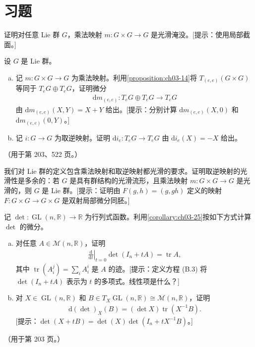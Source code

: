 \documentclass[../../main.tex]{subfiles}
\begin{document}
\section{习题}\label{section:ch07-习题}

\begin{exercise}\label{exercise:ch07-01}
证明对任意 Lie 群 $G$，乘法映射 $m\colon G\times G\to G$ 是光滑淹没。[提示：使用局部截面。]
\end{exercise}

\begin{exercise}\label{exercise:ch07-02}
设 $G$ 是 Lie 群。
\begin{enumerate}[(a)]
\item 记 $m\colon G\times G\to G$ 为乘法映射。利用\cref{proposition:ch03-14}将 $T_{(e,e)}(G\times G)$ 等同于 $T_eG\oplus T_eG$，证明微分
\begin{align*}
\mathrm{d}m_{(e,e)}\colon T_eG\oplus T_eG\to T_eG
\end{align*}
由 $\mathrm{d}m_{(e,e)}(X,Y)=X+Y$ 给出。[提示：分别计算 $\mathrm{d}m_{(e,e)}(X,0)$ 和 $\mathrm{d}m_{(e,e)}(0,Y)$。]
\item 记 $i\colon G\to G$ 为取逆映射。证明 $\mathrm{d}i_e\colon T_eG\to T_eG$ 由 $\mathrm{d}i_e(X)=-X$ 给出。
\end{enumerate}
（用于第 203、522 页。）
\end{exercise}

\begin{exercise}\label{exercise:ch07-03}
我们对 Lie 群的定义包含乘法映射和取逆映射都光滑的要求。证明取逆映射的光滑性是多余的：若 $G$ 是具有群结构的光滑流形，且乘法映射 $m\colon G\times G\to G$ 是光滑的，则 $G$ 是 Lie 群。[提示：证明由 $F(g,h)=(g,gh)$ 定义的映射 $F\colon G\times G\to G\times G$ 是双射局部微分同胚。]
\end{exercise}

\begin{exercise}\label{exercise:ch07-04}
记 $\det\colon\operatorname{GL}(n,\mathbb{R})\to\mathbb{R}$ 为行列式函数。利用\cref{corollary:ch03-25}按如下方式计算 $\det$ 的微分。
\begin{enumerate}[(a)]
\item 对任意 $A\in\mathcal{M}(n,\mathbb{R})$，证明
\begin{align*}
\left.\frac{\mathrm{d}}{\mathrm{d}t}\right|_{t=0}\det(I_n+tA)=\operatorname{tr}A,
\end{align*}
其中 $\operatorname{tr}(A_i^j)=\sum_i A_i^i$ 是 $A$ 的迹。[提示：定义方程 (B.3) 将 $\det(I_n+tA)$ 表示为 $t$ 的多项式。线性项是什么？]
\item 对 $X\in\operatorname{GL}(n,\mathbb{R})$ 和 $B\in T_X\operatorname{GL}(n,\mathbb{R})\cong\mathcal{M}(n,\mathbb{R})$，证明
\begin{align}
\mathrm{d}(\det)_X(B)=(\det X)\operatorname{tr}(X^{-1}B).\label{align:ch07-11}
\end{align}
[提示：$\det(X+tB)=\det(X)\det(I_n+tX^{-1}B)$。]
\end{enumerate}
（用于第 203 页。）
\end{exercise}
\end{document}
